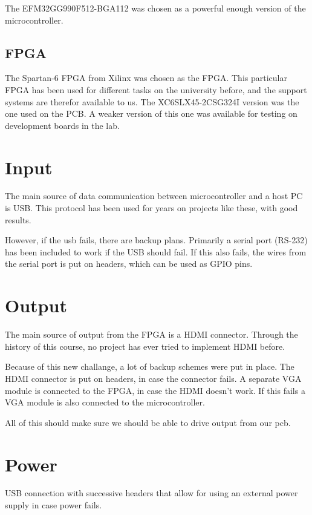 The EFM32GG990F512-BGA112 was chosen as a powerful enough version of the microcontroller.

\subsection{FPGA}
The Spartan-6 FPGA from Xilinx was chosen as the FPGA.
This particular FPGA has been used for different tasks on the university before, and the support systems are therefor available to us.
The XC6SLX45-2CSG324I version was the one used on the PCB.
A  weaker version of this one was available for testing on development boards in the lab.

\section{Input}

The main source of data communication between microcontroller and a host PC is USB.
This protocol has been used for years on projects like these, with good results. 

However, if the usb fails, there are backup plans.
Primarily a serial port (RS-232) has been included to work if the USB should fail.
If this also fails, the wires from the serial port is put on headers, which can be used as GPIO pins.

\section{Output}
The main source of output from the FPGA is a HDMI connector.
Through the history of this course, no project has ever tried to implement HDMI before.

Because of this new challange, a lot of backup schemes were put in place.
The HDMI connector is put on headers, in case the connector fails.
A separate VGA module is connected to the FPGA, in case the HDMI doesn't work.
If this fails a VGA module is also connected to the microcontroller.

All of this should make sure we should be able to drive output from our pcb.

\section{Power}
USB connection with successive headers that allow for using an external power supply in case power fails.

